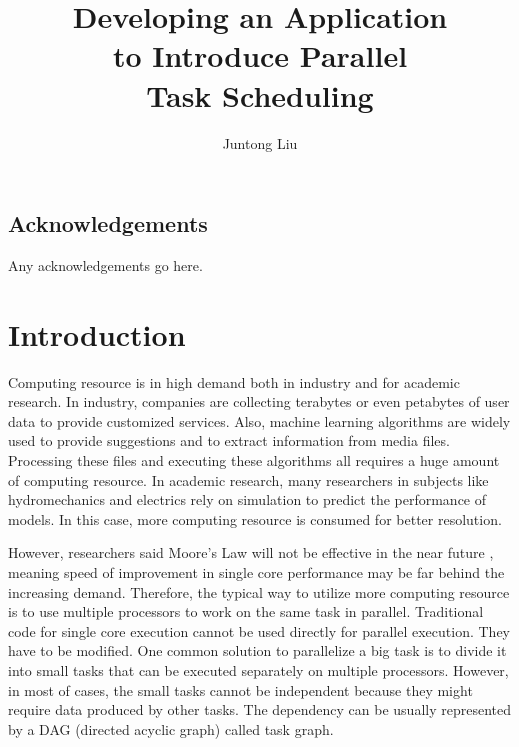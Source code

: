 \documentclass[msc,deptreport, cs]{infthesis}
\begin{document}
\begin{preliminary}

\title{Developing an Application \\to Introduce Parallel \\Task Scheduling}

\author{Juntong Liu}

\abstract{
}

\maketitle

\section*{Acknowledgements}
Any acknowledgements go here. 

\tableofcontents
\end{preliminary}


\chapter{Introduction}

Computing resource is in high demand both in industry and for academic research. In industry, companies are collecting terabytes or even petabytes of user data to provide customized services. Also, machine learning algorithms are widely used to provide suggestions and to extract information from media files. Processing these files and executing these algorithms all requires a huge amount of computing resource. In academic research, many researchers in subjects like hydromechanics and electrics rely on simulation to predict the performance of models. In this case, more computing resource is consumed for better resolution.

However, researchers said Moore's Law will not be effective in the near future \cite{Waldrop2016}, meaning speed of improvement in single core performance may be far behind the increasing demand. Therefore, the typical way to utilize more computing resource is to use multiple processors to work on the same task in parallel. Traditional code for single core execution cannot be used directly for parallel execution. They have to be modified. One common solution to parallelize a big task is to divide it into small tasks that can be executed separately on multiple processors. However, in most of cases, the small tasks cannot be independent because they might require data produced by other tasks. The dependency can be usually represented by a DAG (directed acyclic graph) called task graph.
\end{document}
